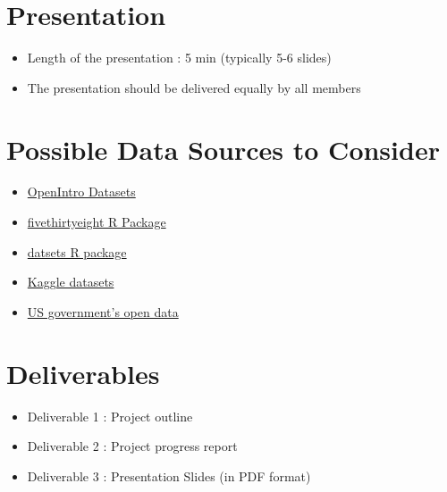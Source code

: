 \documentclass[12pt]{article}
\begin{document}
\section*{Presentation}
\begin{itemize}
    \item Length of the presentation : 5 min (typically 5-6 slides)
    \item The presentation should be delivered equally by all members

\end{itemize}



\section*{Possible Data Sources to Consider}
\begin{itemize}
    \item \href{https://www.openintro.org/data/}{OpenIntro Datasets}
    \item \href{https://cran.r-project.org/web/packages/fivethirtyeight/vignettes/fivethirtyeight.html}{fivethirtyeight 
    R Package}
    \item \href{https://stat.ethz.ch/R-manual/R-devel/library/datasets/html/00Index.html}{datsets R package}
    \item \href{https://www.kaggle.com/datasets}{Kaggle datasets}
    \item \href{https://data.gov/}{US government's open data}
\end{itemize}



\section*{Deliverables}
\begin{itemize}
    \item Deliverable 1 : Project outline 
    \item Deliverable 2 : Project progress report
    \item Deliverable 3 : Presentation Slides (in PDF format)
\end{itemize}
\end{document}
